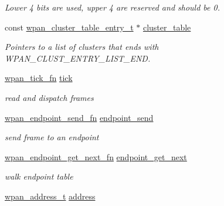 \begin{DoxyCompactItemize}
\begin{DoxyCompactList}\small\item\em Lower 4 bits are used, upper 4 are reserved and should be 0. \end{DoxyCompactList}\item 
const \hyperlink{structwpan__cluster__table__entry__t}{wpan\-\_\-cluster\-\_\-table\-\_\-entry\-\_\-t} $\ast$ \hyperlink{group__wpan__aps_gac7944498524739a9becec626bf9bcb15}{cluster\-\_\-table}
\begin{DoxyCompactList}\small\item\em Pointers to a list of clusters that ends with W\-P\-A\-N\-\_\-\-C\-L\-U\-S\-T\-\_\-\-E\-N\-T\-R\-Y\-\_\-\-L\-I\-S\-T\-\_\-\-E\-N\-D. \end{DoxyCompactList}\item 
\hypertarget{group__wpan__aps_gab472632c6a95d7856d1ea137441ec6a2}{\hyperlink{group__wpan__aps_gaf47f19bd0615a2edf5ec38e7025fdc35}{wpan\-\_\-tick\-\_\-fn} \hyperlink{group__wpan__aps_gab472632c6a95d7856d1ea137441ec6a2}{tick}}\label{group__wpan__aps_gab472632c6a95d7856d1ea137441ec6a2}

\begin{DoxyCompactList}\small\item\em read and dispatch frames \end{DoxyCompactList}\item 
\hypertarget{group__wpan__aps_ga363ce09a97ec0b7a2dbff5b815fc3fbc}{\hyperlink{group__wpan__aps_ga66b2c3b27a4e56cd04ba2f70841e2646}{wpan\-\_\-endpoint\-\_\-send\-\_\-fn} \hyperlink{group__wpan__aps_ga363ce09a97ec0b7a2dbff5b815fc3fbc}{endpoint\-\_\-send}}\label{group__wpan__aps_ga363ce09a97ec0b7a2dbff5b815fc3fbc}

\begin{DoxyCompactList}\small\item\em send frame to an endpoint \end{DoxyCompactList}\item 
\hypertarget{group__wpan__aps_ga249b57f4a0559c0adb038f68d9b5c443}{\hyperlink{group__wpan__aps_ga2f83e173b0da6f1d3c161d93653681b5}{wpan\-\_\-endpoint\-\_\-get\-\_\-next\-\_\-fn} \hyperlink{group__wpan__aps_ga249b57f4a0559c0adb038f68d9b5c443}{endpoint\-\_\-get\-\_\-next}}\label{group__wpan__aps_ga249b57f4a0559c0adb038f68d9b5c443}

\begin{DoxyCompactList}\small\item\em walk endpoint table \end{DoxyCompactList}\item 
\hypertarget{group__wpan__aps_ga66a58a737aee9733019399e2eceabf4a}{\hyperlink{structwpan__address__t}{wpan\-\_\-address\-\_\-t} \hyperlink{group__wpan__aps_ga66a58a737aee9733019399e2eceabf4a}{address}}\label{group__wpan__aps_ga66a58a737aee9733019399e2eceabf4a}


\end{DoxyCompactItemize}
